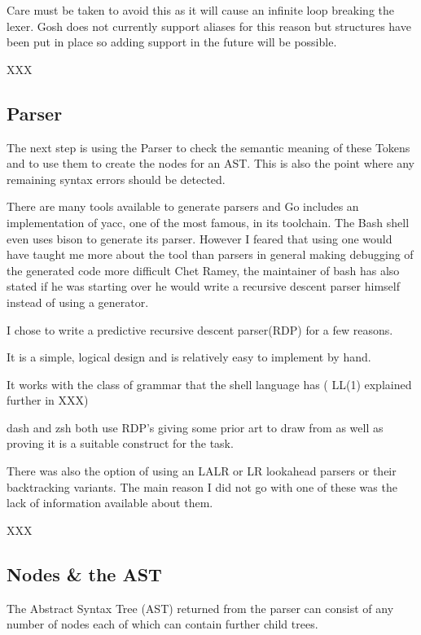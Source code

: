 Care must be taken to avoid this as it will cause an infinite loop breaking the lexer.
Gosh does not currently support aliases for this reason but structures have been put in place so adding support in the future will be possible.

XXX %

\subsection{Parser}
The next step is using the Parser to check the semantic meaning of these Tokens and to use them to create the nodes for an AST.
This is also the point where any remaining syntax errors should be detected.

There are many tools available to generate parsers and Go includes an implementation of yacc, one of the most famous, in its toolchain.
The Bash shell even uses bison to generate its parser.
However I feared that using one would have taught me more about the tool than parsers in general making debugging of the generated code more difficult 
Chet Ramey, the maintainer of bash has also stated if he was starting over he would write a recursive descent parser himself\cite{BASH-ARCH} instead of using a generator.

I chose to write a predictive recursive descent parser(RDP) for a few reasons.
\begin{enumerate*}
	\item It is a simple, logical design and is relatively easy to implement by hand.
    \item It works with the class of grammar that the shell language has (
    LL(1) explained further in XXX)
    \item dash and zsh both use RDP's giving some prior art to draw from as well as proving it is a suitable construct for the task.
\end{enumerate*}

There was also the option of using an LALR or LR lookahead parsers or their backtracking variants.
The main reason I did not go with one of these was the lack of information available about them.


XXX %

\subsection{Nodes \& the AST}
The Abstract Syntax Tree (AST) returned from the parser can consist of any number of nodes each of which can contain further child trees.

